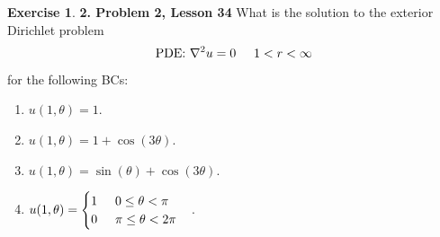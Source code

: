 \documentclass{article}
\theoremstyle{definition}
\newtheorem*{exer*}{Exercise}
\begin{document}
\begin{exer*}\textbf{2. Problem 2, Lesson 34} 
	What is the solution to the exterior Dirichlet problem
	\begin{align*}
	\text{PDE: } \laplacian u = 0 \hspace{0.5cm} 1 < r < \infty
	\end{align*}
	for the following BCs:
	\begin{enumerate}
		\item $u(1,\theta) = 1$.
		\item $u(1,\theta) = 1 + \cos(3\theta)$.
		\item $u(1,\theta) = \sin(\theta) + \cos(3\theta)$.
		\item $u(1,\theta) = \begin{cases}
		1 \hspace{0.5cm} 0 \leq \theta < \pi\\
		0 \hspace{0.5cm} \pi \leq \theta < 2\pi
		\end{cases}$.
	\end{enumerate}



\end{exer*}
\end{document}
